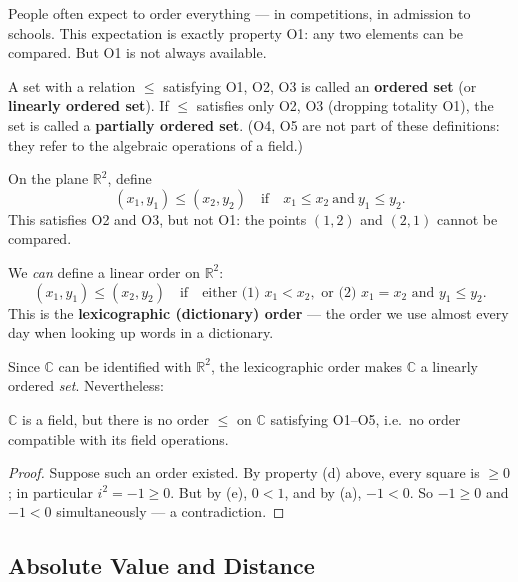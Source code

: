 \documentclass[11pt]{report}
\begin{document}
People often expect to order everything --- in competitions, in admission to schools. This expectation is exactly property O1: any two elements can be compared. But O1 is not always available.

\begin{defbox}
A set with a relation $\leq$ satisfying O1, O2, O3 is called an \textbf{ordered set} (or \textbf{linearly ordered set}). If $\leq$ satisfies only O2, O3 (dropping totality O1), the set is called a \textbf{partially ordered set}. (O4, O5 are not part of these definitions: they refer to the algebraic operations of a field.)
\end{defbox}

\begin{exbox}
On the plane $\mathbb{R}^2$, define
\[
(x_1, y_1) \leq (x_2, y_2) \quad \text{if} \quad x_1 \leq x_2 \ \text{and}\ y_1 \leq y_2.
\]
This satisfies O2 and O3, but not O1: the points $(1,2)$ and $(2,1)$ cannot be compared.
\end{exbox}

\begin{exbox}
We \emph{can} define a linear order on $\mathbb{R}^2$:
\[
(x_1, y_1) \leq (x_2, y_2) \quad \text{if} \quad \text{either (1) } x_1 < x_2, \text{ or (2) } x_1 = x_2 \text{ and } y_1 \leq y_2.
\]
This is the \textbf{lexicographic (dictionary) order} --- the order we use almost every day when looking up words in a dictionary.
\end{exbox}

Since $\mathbb{C}$ can be identified with $\mathbb{R}^2$, the lexicographic order makes $\mathbb{C}$ a linearly ordered \emph{set}. Nevertheless:

\begin{propbox}
$\mathbb{C}$ is a field, but there is no order $\leq$ on $\mathbb{C}$ satisfying O1--O5, i.e.\ no order compatible with its field operations.
\end{propbox}

\begin{proof}
Suppose such an order existed. By property (d) above, every square is $\geq 0$; in particular $i^2 = -1 \geq 0$. But by (e), $0 < 1$, and by (a), $-1 < 0$. So $-1 \geq 0$ and $-1 < 0$ simultaneously --- a contradiction.
\end{proof}

\subsection{Absolute Value and Distance}
\end{document}
